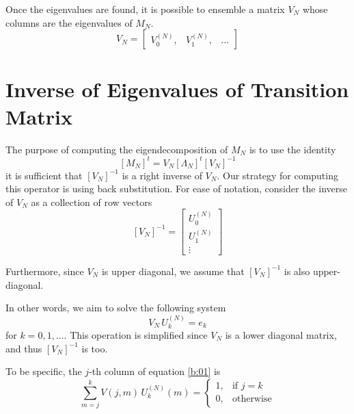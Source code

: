 \documentclass{article}
\newcommand{\spar}[1]{\left[ #1 \right]}
\begin{document}
Once the eigenvalues are found, it is possible to ensemble a matrix $V_N$ whose columns are the eigenvalues of $M_N$.
\begin{equation}
    V_N = \begin{bmatrix}
        V_0^{(N)}, & V_1^{(N)}, & \dots
    \end{bmatrix}
\end{equation}

\section{Inverse of Eigenvalues of Transition Matrix}
\label{ap:inverse}

The purpose of computing the eigendecomposition of $M_N$ is to use the identity
\begin{equation}
    \spar{M_N}^t = V_N \spar{\Lambda_N}^t \spar{V_N}^{-1}
\end{equation}
it is sufficient that $\spar{V_N}^{-1}$ is a right inverse of $V_N$. 
%
Our strategy for computing this operator is using back substitution.
%
For ease of notation, consider the inverse of $V_N$ as a collection of row vectors
\begin{equation}
    \spar{V_N}^{-1} = \begin{bmatrix}
        U_0^{(N)} \\ U_1^{(N)} \\ \vdots
    \end{bmatrix}
\end{equation} 


Furthermore, since $V_N$ is upper diagonal, we assume that $\spar{V_N}^{-1}$ is also upper-diagonal.







In other words, we aim to solve the following system
\begin{equation}
    V_N\, U_k^{(N)} = e_k
    \label{b:01}
\end{equation}
for $k = 0, 1, \dots$. This operation is simplified since 
$V_N$ is a lower diagonal matrix, and thus $\spar{V_N}^{-1}$ is too.

To be specific, the $j$-th column of equation \eqref{b:01} is
\begin{equation}
    \sum_{m=j}^k V(j,m)\, U_k^{(N)}(m) = 
    \begin{cases}
        1, &\text{if } j=k \\
        0, &\text{otherwise}
    \end{cases}
    \label{eq:b02}
\end{equation}
\end{document}
